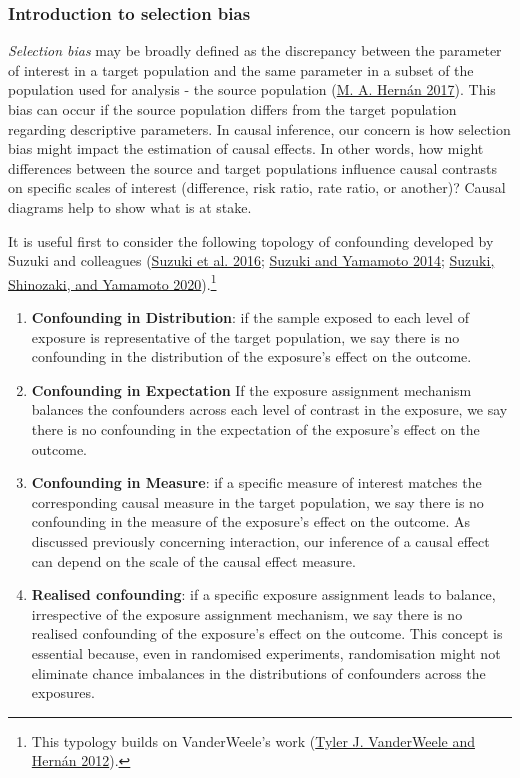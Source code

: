 \documentclass[
  singlecolumn]{article}
\begin{document}
\hypertarget{introduction-to-selection-bias}{%
\subsubsection{Introduction to selection
bias}\label{introduction-to-selection-bias}}

\emph{Selection bias} may be broadly defined as the discrepancy between
the parameter of interest in a target population and the same parameter
in a subset of the population used for analysis - the source population
(\protect\hyperlink{ref-hernuxe1n2017}{M. A. Hernán 2017}). This bias
can occur if the source population differs from the target population
regarding descriptive parameters. In causal inference, our concern is
how selection bias might impact the estimation of causal effects. In
other words, how might differences between the source and target
populations influence causal contrasts on specific scales of interest
(difference, risk ratio, rate ratio, or another)? Causal diagrams help
to show what is at stake.

It is useful first to consider the following topology of confounding
developed by Suzuki and colleagues
(\protect\hyperlink{ref-suzuki2016}{Suzuki et al. 2016};
\protect\hyperlink{ref-suzuki2014}{Suzuki and Yamamoto 2014};
\protect\hyperlink{ref-suzuki2020}{Suzuki, Shinozaki, and Yamamoto
2020}).\footnote{This typology builds on VanderWeele's work
  (\protect\hyperlink{ref-vanderweele2012}{Tyler J. VanderWeele and
  Hernán 2012}).}

\begin{enumerate}
\def\labelenumi{\arabic{enumi}.}
\item
  \textbf{Confounding in Distribution}: if the sample exposed to each
  level of exposure is representative of the target population, we say
  there is no confounding in the distribution of the exposure's effect
  on the outcome.
\item
  \textbf{Confounding in Expectation} If the exposure assignment
  mechanism balances the confounders across each level of contrast in
  the exposure, we say there is no confounding in the expectation of the
  exposure's effect on the outcome.
\item
  \textbf{Confounding in Measure}: if a specific measure of interest
  matches the corresponding causal measure in the target population, we
  say there is no confounding in the measure of the exposure's effect on
  the outcome. As discussed previously concerning interaction, our
  inference of a causal effect can depend on the scale of the causal
  effect measure.
\item
  \textbf{Realised confounding}: if a specific exposure assignment leads
  to balance, irrespective of the exposure assignment mechanism, we say
  there is no realised confounding of the exposure's effect on the
  outcome. This concept is essential because, even in randomised
  experiments, randomisation might not eliminate chance imbalances in
  the distributions of confounders across the exposures.
\end{enumerate}
\end{document}
